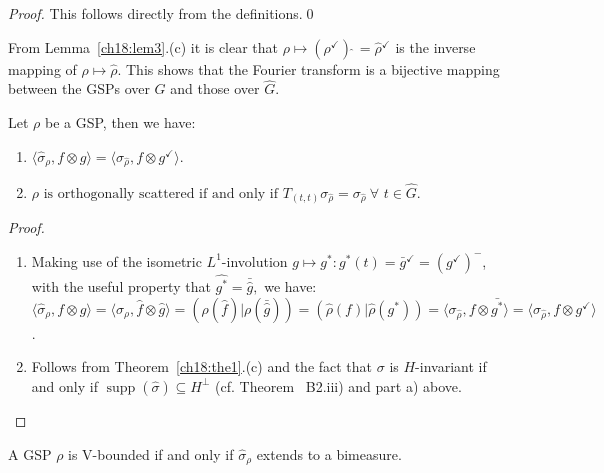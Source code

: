 \documentclass[graybox]{svmult}
\newcommand\checkm{{^\checkmark}}  %
\begin{document}
\begin{proof}
This follows directly from the definitions.\qed
\end{proof}

From Lemma~\ref{ch18:lem3}.(c) it is clear that
$\rho \mapsto ({\rho}\checkm) \hat{\;} =
{\hat{\rho}}\checkm $ is the
inverse mapping of $\rho \mapsto \hat{\rho}$.
This shows that the Fourier transform is a bijective
mapping between the GSPs over $G$ and
those over $\hat{G}$.

\setcounter{theorem}{3}
\begin{theorem}\label{ch18:the4}
Let $\rho $ be a GSP, then we have:
\begin{enumerate}
\item[(a)] $\langle\hat{\sigma}_{\rho},f\otimes g\rangle =
\langle\sigma_{\hat{\rho}},f\otimes {g}\checkm\rangle.$


\item[(b)] $\rho \text{ is orthogonally scattered if and only if }
 T_{(t,t)}\sigma_{\hat{\rho}} = \sigma_{\hat{\rho}} \
 \forall \, \, t \in \hat{G}.$
\end{enumerate}
\end{theorem}

\begin{proof}\
\begin{enumerate}
\item[(a)] Making use of the isometric $L^1$-involution
 $ g \mapsto g^*: g^*(t) = \bar{g}\checkm =(g \checkm)^-$,
with the useful property that
 $ \widehat{g^*} = \bar{\widehat{g}},$ we have:\\
$\langle\hat{\sigma }_{\rho},f\otimes g\rangle
= \langle\sigma _{\rho},\hat{f}\otimes \hat{g}\rangle
= (\rho (\hat{f})| \rho (\bar{\widehat{g}}))
= (\hat{\rho}(f)| \hat{\rho}({g^*}))
= \langle\sigma_{\hat{\rho}},
f\otimes\bar{{g^*}} \rangle
= \langle\sigma_{\hat{\rho}},f\otimes g\checkm \rangle$. \par




\item[(b)] Follows from Theorem~\ref{ch18:the1}.(c) and the fact that  $\sigma$ is
$H$-invariant if and only if
$\operatorname{supp}(\hat{\sigma }) \subseteq  H^{\perp}$
(cf. \cite{fe80} %
Theorem ~B2.iii) and part a) above.
\end{enumerate}
\end{proof}

\setcounter{corollary}{4}
\begin{corollary}
\label{ch18:cor5}
A GSP  $\rho $  is V-bounded if and only if $  \hat{\sigma }_{\rho}$
extends to a bimeasure.
\end{corollary}
\end{document}
